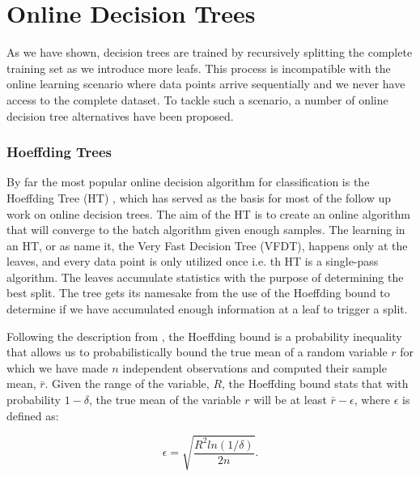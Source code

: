 \section{Online Decision Trees}
\label{sec:bg-dt-online-trees}

As we have shown, decision trees are trained by recursively splitting the complete
training set as we introduce more leafs. This process is incompatible with the online
learning scenario where data points arrive sequentially and we never have access to
the complete dataset. To tackle such a scenario, a number of online decision tree
alternatives have been proposed.

\subsubsection*{Hoeffding Trees}

By far the most popular online decision algorithm for classification is the Hoeffding Tree (HT) \cite{vfdt},
which has served as the basis for most of the follow up work on online decision
trees. The aim of the HT is to create an online algorithm that will converge
to the batch algorithm given enough samples.
The learning in an HT, or as \citet{vfdt} name it, the Very Fast Decision
Tree (VFDT), happens only at the leaves, and every data point is only utilized
once i.e. th HT is a single-pass algorithm. The leaves accumulate statistics
with the purpose of determining the best split. The tree gets its
namesake from the use of the Hoeffding bound to determine if we have accumulated
enough information at a leaf to trigger a split.

Following the description from \citet{vfdt}, the Hoeffding bound \cite{hoeffding-bound} is a probability inequality that allows
us to probabilistically  bound the true mean of a random variable $r$ for which we have
made $n$ independent observations and computed their sample mean, $\bar{r}$. Given
the range of the variable, $R$, the Hoeffding bound stats that with probability
$1-\delta$, the true mean of the variable $r$ will be at least $\bar{r}-\epsilon$, where
$\epsilon$ is defined as:

\begin{equation}
	\epsilon = \sqrt{\frac{R^2ln(1/\delta)}{2n}}.
\end{equation}


